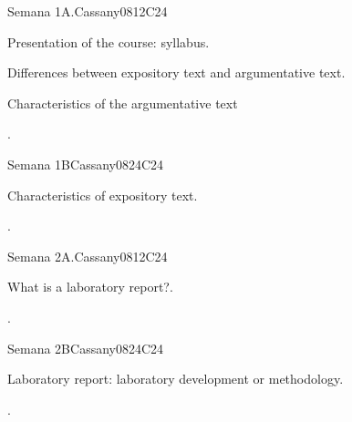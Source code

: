 \begin{syllabus}
\begin{competences}
    \item {}
\end{competences}

\begin{unit}{Semana 1A.}{}{Cassany08}{12}{C24}
   \begin{topics}
      \item Presentation of the course: syllabus.
      \item Differences between expository text and argumentative text.
      \item Characteristics of the argumentative text
   \end{topics}
   \begin{learningoutcomes}
      \item .
   \end{learningoutcomes}
\end{unit}

\begin{unit}{Semana 1B}{}{Cassany08}{24}{C24}
   \begin{topics}
      \item Characteristics of expository text.
   \end{topics}

   \begin{learningoutcomes}
      \item . 
      \end{learningoutcomes}
\end{unit}

\begin{unit}{Semana 2A.}{}{Cassany08}{12}{C24}
   \begin{topics}
      \item What is a laboratory report?.
   \end{topics}
   \begin{learningoutcomes}
      \item .
   \end{learningoutcomes}
\end{unit}

\begin{unit}{Semana 2B}{}{Cassany08}{24}{C24}
   \begin{topics}
      \item Laboratory report: laboratory development or methodology.
   \end{topics}

   \begin{learningoutcomes}
      \item .
      \end{learningoutcomes}
\end{unit}


\end{syllabus}
